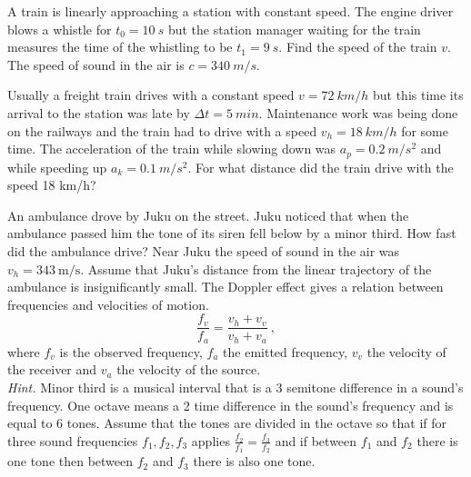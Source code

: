 \documentclass[11pt]{article}
\begin{document}

\probeng
A train is linearly approaching a station with constant speed. The engine driver blows a whistle for $t_0=\SI{10}{s}$ but the station manager waiting for the train measures the time of the whistling to be $t_1=\SI{9}{s}$. Find the speed of the train $v$. The speed of sound in the air is $c=\SI{340}{m/s}$.
\probend
\bigskip


\probeng
Usually a freight train drives with a constant speed $v=\SI{72}{km/h}$ but this time its arrival to the station was late by $\Delta t=\SI{5}{min}$. Maintenance work was being done on the railways and the train had to drive with a speed $v_{h}=\SI{18}{km/h}$ for some time. The acceleration of the train while slowing down was $a_p=\SI{0,2}{m/s^2}$ and while speeding up $a_k=\SI{0,1}{m/s^2}$. For what distance did the train drive with the speed 18 km/h?
\probend
\bigskip


\probeng
An ambulance drove by Juku on the street. Juku noticed that when the ambulance passed him the tone of its siren fell below by a minor third. How fast did the ambulance drive? Near Juku the speed of sound in the air was $v_h = \SI{343}{\meter\per\second}$. Assume that Juku’s distance from the linear trajectory of the ambulance is insignificantly small. The Doppler effect gives a relation between frequencies and velocities of motion.
\[ \frac{f_v}{f_a} = \frac{v_h + v_v}{v_h + v_a} \ , \] 
where \(f_v\) is the observed frequency, \(f_a\) the emitted frequency, \(v_v\) the velocity of the receiver and \(v_a\) the velocity of the source. \\
\emph{Hint.} Minor third is a musical interval that is a 3 semitone difference in a sound’s frequency. One octave means a 2 time difference in the sound’s frequency and is equal to 6 tones. Assume that the tones are divided in the octave so that if for three sound frequencies $f_1, f_2, f_3$ applies $\frac{f_2}{f_1} = \frac{f_3}{f_2}$ and if between $f_1$ and $f_2$ there is one tone then between $f_2$ and $f_3$ there is also one tone.
\probend
\bigskip
\end{document}
